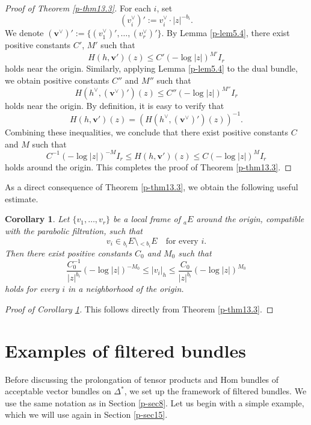 \documentclass[12pt,twoside]{amsart}
\newtheorem{cor}[thm]{Corollary}
\theoremstyle{definition}
\begin{document}
\begin{proof}[Proof of Theorem \ref{p-thm13.3}]
For each $i$, set
\[
(v_i^\vee)' := v_i^\vee \cdot |z|^{-b_i}.
\]
We denote $(\bm{v}^\vee)' := \{(v_1^\vee)', \ldots, (v_r^\vee)'\}$. 
By Lemma \ref{p-lem5.4}, there exist positive constants $C'$, $M'$ such that
\[
H(h, \bm{v}')(z) \leq C'(-\log |z|)^{M'} I_r
\]
holds near the origin. 
Similarly, applying 
Lemma \ref{p-lem5.4} to the dual bundle, 
we obtain positive constants $C''$ and $M''$ such that
\[
H(h^\vee, (\bm{v}^\vee)')(z) \leq C''(-\log |z|)^{M''} I_r
\]
holds near the origin. 
By definition, it is easy to verify that
\[
H(h, \bm{v}')(z) = \left(H(h^\vee, (\bm{v}^\vee)')(z)\right)^{-1}.
\]
Combining these inequalities, we conclude that 
there exist positive constants $C$ and $M$ such that
\[
C^{-1}(-\log |z|)^{-M} I_r \leq H(h, \bm{v}')(z) \leq C(-\log |z|)^M I_r
\]
holds around the origin. This completes the proof of Theorem \ref{p-thm13.3}.
\end{proof}

As a direct consequence of Theorem \ref{p-thm13.3}, we obtain 
the following useful estimate.

\begin{cor}\label{p-cor13.4} 
Let $\{v_1, \ldots, v_r\}$ be a local frame of ${}_a E$ around 
the origin, compatible with the parabolic filtration, such that 
\[
v_i \in {}_{b_i} E \setminus {}_{<b_i} E \quad \text{for every } i.
\]
Then there exist positive constants $C_0$ and $M_0$ such that
\[
\frac{C_0^{-1}}{|z|^{b_i}} \left(-\log |z|\right)^{-M_0} 
\leq |v_i|_h \leq \frac{C_0}{|z|^{b_i}} \left(-\log |z|\right)^{M_0}
\]
holds for every $i$ in a neighborhood of the origin.
\end{cor}

\begin{proof}[Proof of Corollary \ref{p-cor13.4}]
This follows directly from Theorem \ref{p-thm13.3}.
\end{proof}

\section{Examples of filtered bundles}\label{p-sec14}

Before discussing the prolongation of tensor products 
and Hom bundles of acceptable vector bundles on 
$\Delta^*$, we set up the framework of filtered bundles. 
We use the same notation as in Section \ref{p-sec8}. 
Let us begin with a simple example, which we 
will use again in Section \ref{p-sec15}. 
\end{document}
